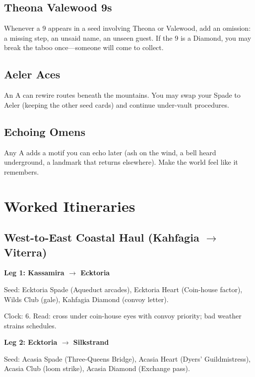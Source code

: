 \subsection{Theona Valewood 9s}
Whenever a 9 appears in a seed involving Theona or Valewood, add an omission: a missing step, an unsaid name, an unseen guest. If the 9 is a Diamond, you may break the taboo once---someone will come to collect.

\subsection{Aeler Aces}
An A can rewire routes beneath the mountains. You may swap your Spade to Aeler (keeping the other seed cards) and continue under-vault procedures.

\subsection{Echoing Omens}
Any A adds a motif you can echo later (ash on the wind, a bell heard underground, a landmark that returns elsewhere). Make the world feel like it remembers.

\section{Worked Itineraries}

\subsection{West-to-East Coastal Haul (Kahfagia $\rightarrow$ Viterra)}

\textbf{Leg 1: Kassamira $\rightarrow$ Ecktoria}

Seed: Ecktoria Spade (Aqueduct arcades), Ecktoria Heart (Coin-house factor), Wilds Club (gale), Kahfagia Diamond (convoy letter).

Clock: 6. Read: cross under coin-house eyes with convoy priority; bad weather strains schedules.

\textbf{Leg 2: Ecktoria $\rightarrow$ Silkstrand}

Seed: Acasia Spade (Three-Queens Bridge), Acasia Heart (Dyers' Guildmistress), Acasia Club (loom strike), Acasia Diamond (Exchange pass).

